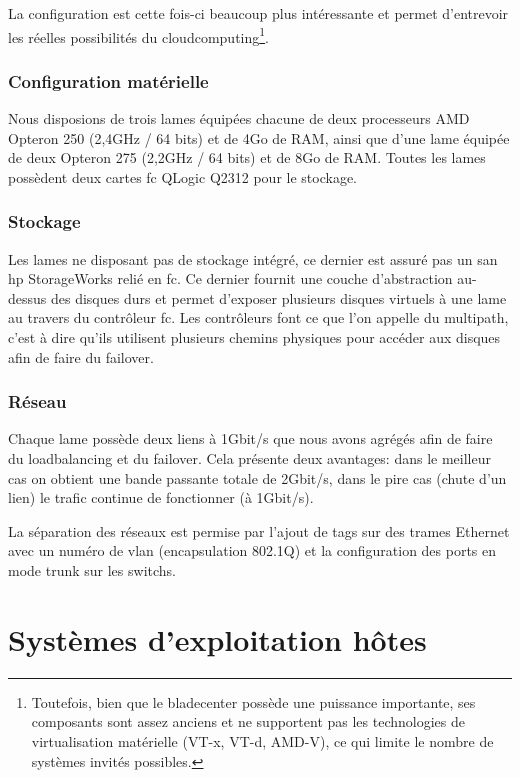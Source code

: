\documentclass[a4paper,oneside]{report}
\begin{document}
La configuration est cette fois-ci beaucoup plus intéressante et permet d'entrevoir les réelles possibilités du \gls{cloudcomputing}\footnote{Toutefois, bien que le \gls{bladecenter} possède une puissance importante, ses composants sont assez anciens et ne supportent pas les technologies de \gls{virtualisation} matérielle (VT-x, VT-d, AMD-V), ce qui limite le nombre de systèmes invités possibles.}.

\subsection{Configuration matérielle}
Nous disposions de trois lames équipées chacune de deux processeurs AMD Opteron 250 (2,4GHz / 64 bits) et de 4Go de RAM, ainsi que d'une lame équipée de deux Opteron 275 (2,2GHz / 64 bits) et de 8Go de RAM.\newline
Toutes les lames possèdent deux cartes \gls{fc} QLogic Q2312 pour le stockage.

\subsection{Stockage}
Les lames ne disposant pas de stockage intégré, ce dernier est assuré pas un \gls{san} \gls{hp} StorageWorks relié en \gls{fc}.
Ce dernier fournit une couche d'abstraction au-dessus des disques durs et permet d'exposer plusieurs disques \og virtuels \fg à une lame au travers du contrôleur \gls{fc}.\newline
Les contrôleurs font ce que l'on appelle du \gls{multipath}, c'est à dire qu'ils utilisent plusieurs chemins physiques pour accéder aux disques afin de faire du \gls{failover}.

\subsection{Réseau}
Chaque lame possède deux liens à 1Gbit/s que nous avons agrégés afin de faire du \gls{loadbalancing} et du \gls{failover}. Cela présente deux avantages: dans le meilleur cas on obtient une bande passante totale de 2Gbit/s, dans le pire cas (chute d'un lien) le trafic continue de fonctionner (à 1Gbit/s).

La séparation des réseaux est permise par l'ajout de tags sur des trames Ethernet avec un numéro de \gls{vlan} (encapsulation 802.1Q) et la configuration des ports en mode trunk sur les \glspl{switch}.


\chapter{Systèmes d'exploitation hôtes}
\end{document}
